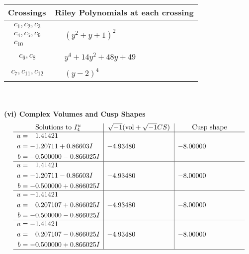 \documentclass[1p]{elsarticle_modified}
\theoremstyle{definition}
\newcommand{\I}{\sqrt{-1}}
\begin{document}
\begin{tabular}{m{50pt}|m{274pt}}
Crossings & \hspace{64pt}Riley Polynomials at each crossing \\
\hline $$\begin{aligned}c_{1},c_{2},c_{3}\\c_{4},c_{5},c_{9}\\c_{10}\end{aligned}$$&$\begin{aligned}
&(y^2+y+1)^2
\end{aligned}$\\
\hline $$\begin{aligned}c_{6},c_{8}\end{aligned}$$&$\begin{aligned}
&y^4+14 y^2+48 y+49
\end{aligned}$\\
\hline $$\begin{aligned}c_{7},c_{11},c_{12}\end{aligned}$$&$\begin{aligned}
&(y-2)^4
\end{aligned}$\\
\hline
\end{tabular}\\~\\
\newpage\flushleft \textbf{(vi) Complex Volumes and Cusp Shapes}
$$\begin{array}{c|c|c}  
\text{Solutions to }I^u_{4}& \I (\text{vol} + \sqrt{-1}CS) & \text{Cusp shape}\\
 \hline 
\begin{aligned}
u &= \phantom{-}1.41421\phantom{ +0.000000I} \\
a &= -1.20711 + 0.86603 I \\
b &= -0.500000 - 0.866025 I\end{aligned}
 & -4.93480\phantom{ +0.000000I} & -8.00000\phantom{ +0.000000I} \\ \hline\begin{aligned}
u &= \phantom{-}1.41421\phantom{ +0.000000I} \\
a &= -1.20711 - 0.86603 I \\
b &= -0.500000 + 0.866025 I\end{aligned}
 & -4.93480\phantom{ +0.000000I} & -8.00000\phantom{ +0.000000I} \\ \hline\begin{aligned}
u &= -1.41421\phantom{ +0.000000I} \\
a &= \phantom{-}0.207107 + 0.866025 I \\
b &= -0.500000 - 0.866025 I\end{aligned}
 & -4.93480\phantom{ +0.000000I} & -8.00000\phantom{ +0.000000I} \\ \hline\begin{aligned}
u &= -1.41421\phantom{ +0.000000I} \\
a &= \phantom{-}0.207107 - 0.866025 I \\
b &= -0.500000 + 0.866025 I\end{aligned}
 & -4.93480\phantom{ +0.000000I} & -8.00000\phantom{ +0.000000I}\\
 \hline 
 \end{array}$$\newpage\newpage\renewcommand{\arraystretch}{1}
\end{document}
